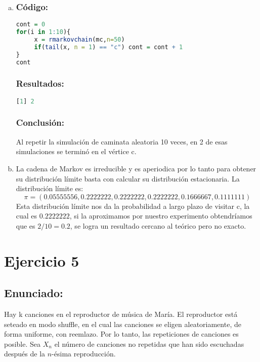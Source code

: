 \documentclass{article}
\begin{document}
\begin{enumerate}[(a)] 
\item 

\subsubsection*{Código:}
\begin{lstlisting}[language=R]
cont = 0
for(i in 1:10){
     x = rmarkovchain(mc,n=50)
     if(tail(x, n = 1) == "c") cont = cont + 1
}
cont
\end{lstlisting}

\subsubsection*{Resultados:}
\begin{lstlisting}[language=R]
[1] 2
\end{lstlisting}

\subsubsection*{Conclusión:}
Al repetir la simulación de caminata aleatoria 10 veces, en 2 de esas simulaciones se terminó en el vértice c.  


\item La cadena de Markov es irreducible y es aperiodica por lo tanto para obtener su distribución límite basta con calcular su distribución estacionaria.
La distribución límite es:
$$ \pi = (0.05555556,0.2222222,0.2222222,0.2222222,0.1666667,0.1111111) $$
Esta distribución límite nos da la probabilidad a largo plazo de visitar c, la cual es $0.2222222$, si la aproximamos por nuestro experimento obtendríamos que es $2/10 = 0.2$, se logra un resultado cercano al teórico pero no exacto.

\end{enumerate}


\section*{Ejercicio 5}
\subsection*{Enunciado:}
Hay k canciones en el reproductor de música de María. El reproductor está seteado en modo shuffle, en el cual las canciones se eligen aleatoriamente, de forma uniforme, con reemlazo. Por lo tanto, las repeticiones de canciones es posible.
Sea $X_n$ el número de canciones no repetidas que han sido escuchadas después de la $n$-ésima reproducción.
\end{document}
